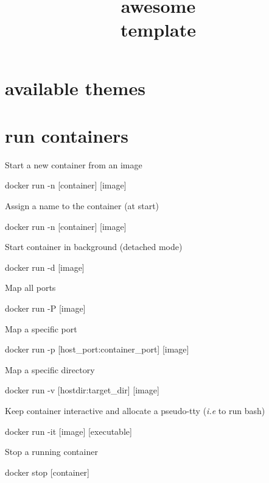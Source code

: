 \documentclass{refcard}
\title{awesome \\template}
\begin{document}
\maketitle

\section{available themes}



\section{run containers}

Start a new container from an image%
\begin{ttyenv}
docker run -n [container] [image]
\end{ttyenv}


Assign a name to the container (at start)
\begin{ttyenv}
docker run -n [container] [image]
\end{ttyenv}

Start container in background (detached mode)
\begin{ttyenv}
docker run -d [image]
\end{ttyenv}

Map all ports
\begin{ttyenv}
docker run -P [image]
\end{ttyenv}

Map a specific port
\begin{ttyenv}
docker run -p [host_port:container_port] [image]
\end{ttyenv}

Map a specific directory
\begin{ttyenv}
docker run -v [hostdir:target_dir] [image]
\end{ttyenv}

Keep container interactive and allocate a pseudo-tty (\textit{i.e} to run bash)
\begin{ttyenv}
docker run -it [image] [executable] 
\end{ttyenv}

Stop a running container
\begin{ttyenv}
docker stop [container]
\end{ttyenv}
\end{document}
